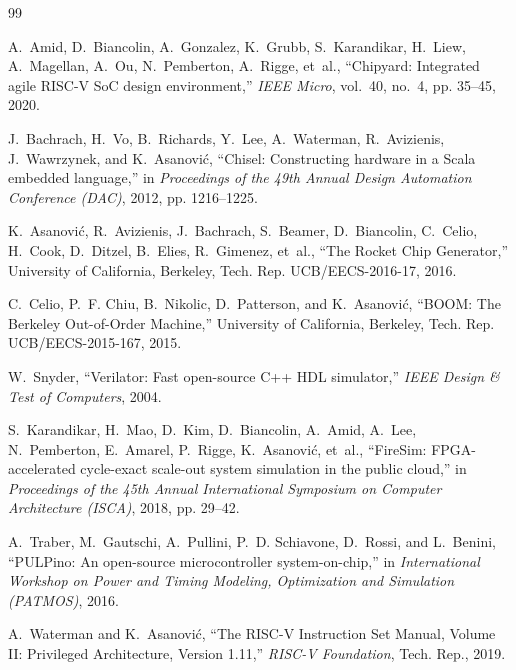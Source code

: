 \documentclass[12pt,a4paper]{article}
\begin{document}
\begin{thebibliography}{99}

A.~Amid, D.~Biancolin, A.~Gonzalez, K.~Grubb, S.~Karandikar, H.~Liew, A.~Magellan, A.~Ou, N.~Pemberton, A.~Rigge, et~al.,
\newblock ``Chipyard: Integrated agile RISC-V SoC design environment,''
\newblock \emph{IEEE Micro}, vol.~40, no.~4, pp. 35--45, 2020.

J.~Bachrach, H.~Vo, B.~Richards, Y.~Lee, A.~Waterman, R.~Avizienis, J.~Wawrzynek, and K.~Asanovi\'{c},
\newblock ``Chisel: Constructing hardware in a Scala embedded language,''
\newblock in \emph{Proceedings of the 49th Annual Design Automation Conference (DAC)}, 2012, pp. 1216--1225.

K.~Asanovi\'{c}, R.~Avizienis, J.~Bachrach, S.~Beamer, D.~Biancolin, C.~Celio, H.~Cook, D.~Ditzel, B.~Elies, R.~Gimenez, et~al.,
\newblock ``The Rocket Chip Generator,''
\newblock University of California, Berkeley, Tech. Rep. UCB/EECS-2016-17, 2016.

C.~Celio, P.~F. Chiu, B.~Nikolic, D.~Patterson, and K.~Asanovi\'{c},
\newblock ``BOOM: The Berkeley Out-of-Order Machine,''
\newblock University of California, Berkeley, Tech. Rep. UCB/EECS-2015-167, 2015.

W.~Snyder,
\newblock ``Verilator: Fast open-source C++ HDL simulator,''
\newblock \emph{IEEE Design \& Test of Computers}, 2004.

S.~Karandikar, H.~Mao, D.~Kim, D.~Biancolin, A.~Amid, A.~Lee, N.~Pemberton, E.~Amarel, P.~Rigge, K.~Asanovi\'{c}, et~al.,
\newblock ``FireSim: FPGA-accelerated cycle-exact scale-out system simulation in the public cloud,''
\newblock in \emph{Proceedings of the 45th Annual International Symposium on Computer Architecture (ISCA)}, 2018, pp. 29--42.

A.~Traber, M.~Gautschi, A.~Pullini, P.~D. Schiavone, D.~Rossi, and L.~Benini,
\newblock ``PULPino: An open-source microcontroller system-on-chip,''
\newblock in \emph{International Workshop on Power and Timing Modeling, Optimization and Simulation (PATMOS)}, 2016.

A.~Waterman and K.~Asanovi\'{c},
\newblock ``The RISC-V Instruction Set Manual, Volume II: Privileged Architecture, Version 1.11,''
\newblock \emph{RISC-V Foundation}, Tech. Rep., 2019.

\end{thebibliography}
\end{document}
